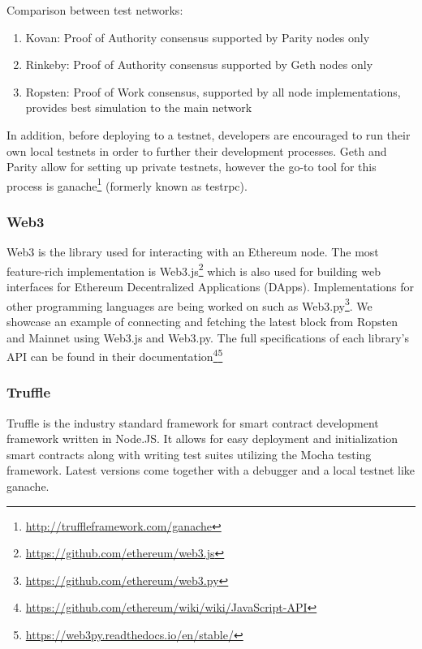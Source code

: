 Comparison between test networks:
\begin{enumerate}
    \item Kovan: Proof of Authority consensus supported by Parity nodes only
    \item Rinkeby: Proof of Authority consensus supported by Geth nodes only
    \item Ropsten: Proof of Work consensus, supported by all node implementations, provides best simulation to the main network 
\end{enumerate}

In addition, before deploying to a testnet, developers are encouraged to run their own local testnets in order to further their development processes. Geth and Parity allow for setting up private testnets, however the go-to tool for this process is ganache\footnote{\url{http://truffleframework.com/ganache}} (formerly known as testrpc).

\subsubsection{Web3}
Web3 is the library used for interacting with an Ethereum node. The most feature-rich implementation is Web3.js\footnote{\url{https://github.com/ethereum/web3.js}} which is also used for building web interfaces for Ethereum Decentralized Applications (DApps). Implementations for other programming languages are being worked on such as Web3.py\footnote{\url{https://github.com/ethereum/web3.py}}. We showcase an example of connecting and fetching the latest block from Ropsten and Mainnet using Web3.js and Web3.py. The full specifications of each library's API can be found in their documentation\footnote{\url{https://github.com/ethereum/wiki/wiki/JavaScript-API}}\footnote{\url{https://web3py.readthedocs.io/en/stable/}}




\subsubsection{Truffle}
Truffle is the industry standard framework for smart contract development framework written in Node.JS. It allows for easy deployment and initialization smart contracts along with writing test suites utilizing the Mocha testing framework. Latest versions come together with a debugger and a local testnet like ganache. 


